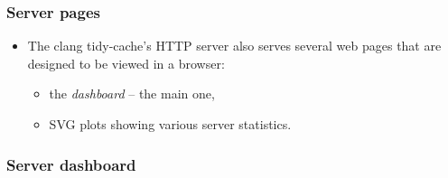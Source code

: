 \documentclass[compress,table,xcolor=table]{beamer}
\begin{document}
\begin{frame}
  \frametitle{Server pages}
  \LARGE
  \begin{itemize}
  \item The clang tidy-cache's HTTP server also serves several web pages
    that are designed to be viewed in a browser:
    \begin{itemize}
        \item the {\em dashboard} -- the main one,
        \item SVG plots showing various server statistics.
    \end{itemize}
  \end{itemize}
\end{frame}
\begin{frame}
  \frametitle{Server dashboard}
\end{frame}
\end{document}
